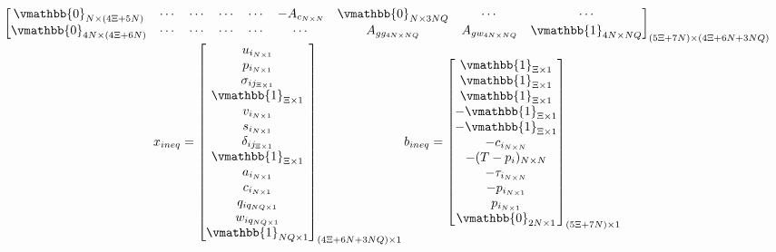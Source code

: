 \documentclass[letterpaper, 10pt, conference]{IEEEtran}
\begin{document}
\begin{equation}
\begin{array}{c}
\begin{bmatrix}
        \vmathbb{0}_{N \times (4\Xi + 5N)}   & \cdots                                    & \cdots                                    & \cdots                       & \cdots                              & -A_{c_{N \times N}}             & \vmathbb{0}_{N \times 3NQ} & \cdots                & \cdots                    \\
        \vmathbb{0}_{4N \times (4\Xi + 6N)}  & \cdots                                    & \cdots                                    & \cdots                       & \cdots                              & \cdots                          & A_{gg_{4N \times NQ}}     & A_{gw_{4N \times NQ}} & \vmathbb{1}_{4N \times NQ} \\
    \end{bmatrix}_{(5\Xi + 7N) \times (4\Xi + 6N + 3NQ)}                                                                                                                                                                                                                                                                       \\
    x_{ineq} =
    \begin{bmatrix}
        u_{i_{N \times 1}} \\ p_{i_{N \times 1}} \\ \sigma_{ij_{\Xi \times 1}} \\ \vmathbb{1}_{\Xi \times 1} \\ v_{i_{N \times 1}} \\ s_{i_{N \times 1}} \\ \delta_{ij_{\Xi \times 1}} \\ \vmathbb{1}_{\Xi \times 1} \\ a_{i_{N \times 1}} \\ c_{i_{N \times 1}} \\ q_{iq_{NQ \times1}} \\w_{iq_{NQ \times 1}} \\ \vmathbb{1}_{NQ \times 1} \\
    \end{bmatrix}_{(4\Xi + 6N + 3NQ) \times 1}
    b_{ineq} =
    \begin{bmatrix}
        \vmathbb{1}_{\Xi \times 1} \\ \vmathbb{1}_{\Xi \times 1} \\ \vmathbb{1}_{\Xi \times 1} \\ -\vmathbb{1}_{\Xi \times 1} \\ -\vmathbb{1}_{\Xi \times 1} \\ -c_{i_{N \times N}} \\ -(T-p_i)_{N \times N} \\ -\tau_{i_{N \times N}} \\ -p_{i_{N \times 1}} \\ p_{i_{N \times 1}} \\ \vmathbb{0}_{2N \times 1} \\
    \end{bmatrix}_{(5\Xi + 7N) \times 1}
\end{array}
\end{equation}\\
\normalsize
\end{document}

